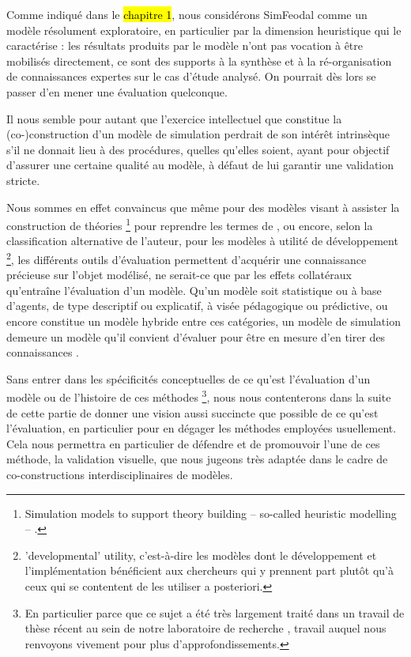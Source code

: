 Comme indiqué dans le \hl{chapitre 1}, nous considérons SimFeodal comme un modèle résolument exploratoire, en particulier par la dimension heuristique qui le caractérise : les résultats produits par le modèle n'ont pas vocation à être mobilisés directement, ce sont des supports à la synthèse et à la ré-organisation de connaissances expertes sur le cas d'étude analysé.
On pourrait dès lors se passer d'en mener une évaluation quelconque.

Il nous semble pour autant que l'exercice intellectuel que constitue la (co-)construction d'un modèle de simulation perdrait de son intérêt intrinsèque s'il ne donnait lieu à des procédures, quelles qu'elles soient, ayant pour objectif d'assurer une certaine qualité au modèle, à défaut de lui garantir une validation stricte.

Nous sommes en effet convaincus que même pour des modèles visant à \og assister la construction de théories\fg{}
\footnote{
	\og Simulation models to support theory building -- so-called heuristic modelling -- \textelp{}.\fg{}
} pour reprendre les termes de \textcite[260]{lake_trends_2014}, ou encore, selon la classification alternative de l'auteur, pour les modèles à utilité \og de développement\fg{}
\footnote{
	\og 'developmental' utility\fg{}, c'est-à-dire les modèles dont le développement et l'implémentation bénéficient aux chercheurs qui y prennent part plutôt qu'à ceux qui se contentent de les utiliser a posteriori.
}, les différents outils d'évaluation permettent d'acquérir une connaissance précieuse sur l'objet modélisé, ne serait-ce que par les effets collatéraux qu'entraîne l'évaluation d'un modèle.
Qu'un modèle soit statistique ou à base d'agents, de type descriptif ou explicatif, à visée pédagogique ou prédictive, ou encore constitue un modèle \og hybride\fg{} entre ces catégories, un modèle de simulation demeure un modèle qu'il convient d'évaluer pour être en mesure d'en tirer des connaissances \autocite[299-300]{sargent_history_2017}.

Sans entrer dans les spécificités conceptuelles de ce qu'est l'évaluation d'un modèle ou de l'histoire de ces méthodes
\footnote{
	En particulier parce que ce sujet a été très largement traité dans un travail de thèse récent au sein de notre laboratoire de recherche \autocite[pp. 58--184]{rey-coyrehourcq_plateforme_2015}, travail auquel nous renvoyons vivement pour plus d'approfondissements.
}, nous nous contenterons dans la suite de cette partie de donner une vision aussi succincte que possible de ce qu'est l'évaluation, en particulier pour en dégager les méthodes employées usuellement.
Cela nous permettra en particulier de défendre et de promouvoir l'une de ces méthode, la validation visuelle, que nous jugeons très adaptée dans le cadre de co-constructions interdisciplinaires de modèles.

